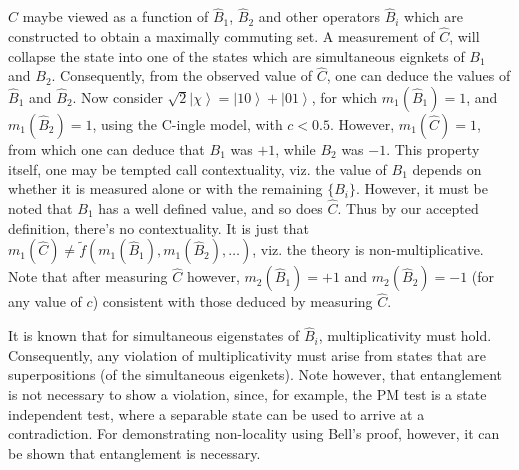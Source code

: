 \documentclass[british,aps,prl,superscriptaddress,nofootinbib,times,reprint]{revtex4-1}
\theoremstyle{plain}
\theoremstyle{definition}
\theoremstyle{remark}
\theoremstyle{remark}
\theoremstyle{remark}
\theoremstyle{plain}
\theoremstyle{plain}
\theoremstyle{plain}
\theoremstyle{definition}
\theoremstyle{definition}
\begin{document}
 $\hat{C}$ maybe viewed as
a function of $\hat{B}_{1}$, $\hat{B}_{2}$ and
other operators $\hat{B}_{i}$ which are
constructed to obtain a maximally commuting set. A
measurement of $\hat{C}$, will collapse the state
into one of the states which are simultaneous
eignkets of $B_{1}$ and $B_{2}$. Consequently,
from the observed value of $\hat{C}$, one can
deduce the values of $\hat{B}_{1}$ and
$\hat{B}_{2}$. Now consider
$\sqrt{2}\left|\chi\right\rangle
=\left|10\right\rangle +\left|01\right\rangle $,
for which $m_{1}(\hat{B}_{1})=1$, and
$m_{1}(\hat{B}_{2})=1$, using the C-ingle model,
with $c<0.5$. However, $m_{1}(\hat{C})=1$, from
which one can deduce that $B_{1}$ was $+1$, while
$B_{2}$ was $-1$.  This property itself, one may
be tempted call contextuality, viz.  the value of
$B_{1}$ depends on whether it is measured alone or
with the remaining $\{B_{i}\}$. However, it must
be noted that $B_{1}$ has a well defined value,
and so does $\hat{C}$. Thus by our accepted
definition, there's no contextuality. It is just
that $m_{1}(\hat{C})\neq
\tilde f(m_{1}(\hat{B}_{1}),m_{1}(\hat{B}_{2}),\dots)$,
viz. the theory is non-multiplicative. Note that
after measuring $\hat{C}$ however,
$m_{2}(\hat{B}_{1})=+1$ and
$m_{2}(\hat{B}_{2})=-1$ (for any value of $c$)
consistent with those deduced by measuring
$\hat{C}$.


It is known that for simultaneous eigenstates of
$\hat{B}_{i}$, multiplicativity must hold.
Consequently, any violation of multiplicativity
must arise from states that are superpositions (of
the simultaneous eigenkets).  Note however, that
entanglement is not necessary to show a violation,
since, for example, the PM test is a state
independent test, where a separable state can be
used to arrive at a contradiction. For
demonstrating non-locality using Bell's proof,
however, it can be shown that entanglement is
necessary.  

\end{document}
